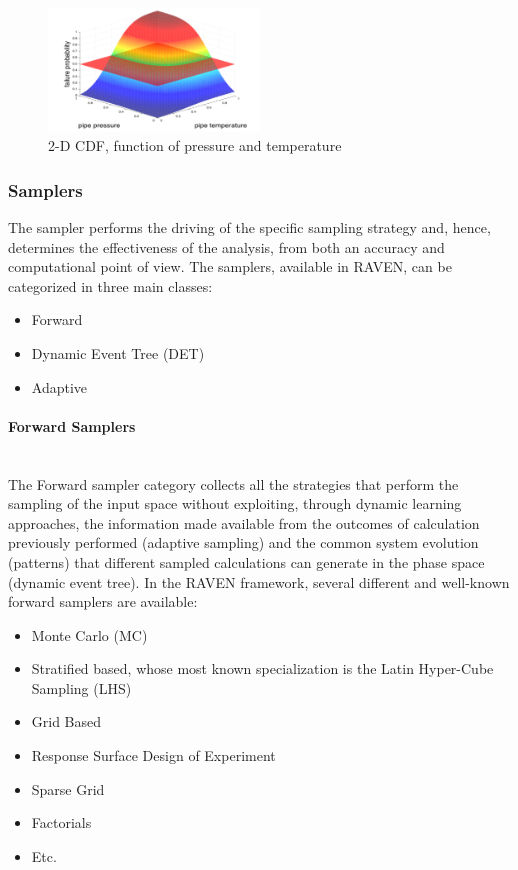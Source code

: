 \begin{figure}
  \centering
  \includegraphics[width=0.5\textwidth]  {pics/NDimensionalDistributionExample.png}
  \caption{2-D CDF, function of pressure and temperature}
  \label{fig:NDDistributionExample}
\end{figure}

\subsubsection{Samplers}
The sampler performs the driving of the specific sampling strategy and, hence, determines the effectiveness of the 
analysis, from both an accuracy and computational point of view.  The samplers, available in RAVEN, can be 
categorized in three main classes:
\begin{itemize}
 \item Forward
 \item Dynamic Event Tree (DET)
 \item Adaptive
\end{itemize}
\paragraph{Forward Samplers} ~\\
The Forward sampler category collects all the strategies that perform the sampling of the input space without exploiting, 
through dynamic learning approaches, the information made available from the outcomes of calculation previously 
performed (adaptive sampling) and the common system evolution (patterns) that different sampled calculations can 
generate in the phase space (dynamic event tree).
In the RAVEN framework, several different and well-known forward samplers are available:
\begin{itemize}
\item Monte Carlo (MC)
\item Stratified based, whose most known specialization is the Latin Hyper-Cube Sampling (LHS)
\item Grid Based
\item Response Surface Design of Experiment
\item Sparse Grid
\item Factorials
\item Etc.
\end{itemize}
